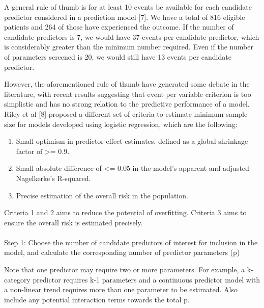 \documentclass[
  letterpaper,
  DIV=11,
  numbers=noendperiod]{scrartcl}
\makeatletter
\let\oldparagraph\paragraph
\renewcommand{\paragraph}{
    \@ifstar
      \xxxParagraphStar
      \xxxParagraphNoStar
  }
\newcommand{\xxxParagraphStar}[1]{\oldparagraph*{#1}\mbox{}}
\newcommand{\xxxParagraphNoStar}[1]{\oldparagraph{#1}\mbox{}}
\providecommand{\tightlist}{%
  \setlength{\itemsep}{0pt}\setlength{\parskip}{0pt}}\usepackage{longtable,booktabs,array}
\makeatother
\begin{document}
A general rule of thumb is for at least 10 events be available for each
candidate predictor considered in a prediction model {[}7{]}. We have a
total of 816 eligible patients and 264 of those have experienced the
outcome. If the number of candidate predictors is 7, we would have 37
events per candidate predictor, which is considerably greater than the
minimum number required. Even if the number of parameters screened is
20, we would still have 13 events per candidate predictor.

However, the aforementioned rule of thumb have generated some debate in
the literature, with recent results suggesting that event per variable
criterion is too simplistic and has no strong relation to the predictive
performance of a model. Riley et al {[}8{]} proposed a different set of
criteria to estimate minimum sample size for models developed using
logistic regression, which are the following:

\begin{enumerate}
\def\labelenumi{\arabic{enumi}.}
\tightlist
\item
  Small optimism in predictor effect estimates, defined as a global
  shrinkage factor of \textgreater= 0.9.
\item
  Small absolute difference of \textless= 0.05 in the model's apparent
  and adjusted Nagelkerke's R-squared.
\item
  Precise estimation of the overall risk in the population.
\end{enumerate}

Criteria 1 and 2 aims to reduce the potential of overfitting. Criteria 3
aims to ensure the overall risk is estimated precisely.

\paragraph{Step 1: Choose the number of candidate predictors of interest
for inclusion in the model, and calculate the corresponding number of
predictor parameters
(p)}\label{step-1-choose-the-number-of-candidate-predictors-of-interest-for-inclusion-in-the-model-and-calculate-the-corresponding-number-of-predictor-parameters-p}

Note that one predictor may require two or more parameters. For example,
a k-category predictor requires k-1 parameters and a continuous
predictor model with a non-linear trend requires more than one parameter
to be estimated. Also include any potential interaction terms towards
the total p.
\end{document}
